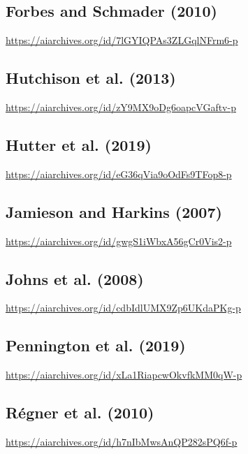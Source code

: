 \documentclass[
  doc, a4paper]{apa7}
\begin{document}
\subsection{Forbes and Schmader (2010)}\label{forbesretrainingattitudesstereotypes2010}

\url{https://aiarchives.org/id/7lGYIQPAs3ZLGqlNFrm6-p}

\subsection{Hutchison et al. (2013)}\label{hutchisongoalscanbe2013}

\url{https://aiarchives.org/id/zY9MX9oDg6oapcVGaftv-p}

\subsection{Hutter et al. (2019)}\label{hutterwomenstereotypethreat2019}

\url{https://aiarchives.org/id/eG36qVia9oOdFs9TFop8-p}

\subsection{Jamieson and Harkins (2007)}\label{jamiesonmereeffortstereotype2007}

\url{https://aiarchives.org/id/gwgS1iWbxA56gCr0Vis2-p}

\subsection{Johns et al. (2008)}\label{johnsstereotypethreatexecutive2008}

\url{https://aiarchives.org/id/cdbIdlUMX9Zp6UKdaPKg-p}

\subsection{Pennington et al. (2019)}\label{penningtonstereotypethreatmay2019}

\url{https://aiarchives.org/id/xLa1RiapcwOkvfkMM0qW-p}

\subsection{Régner et al. (2010)}\label{regnerindividualdifferencesworking2010}

\url{https://aiarchives.org/id/h7nIbMwsAnQP282sPQ6f-p}
\end{document}
